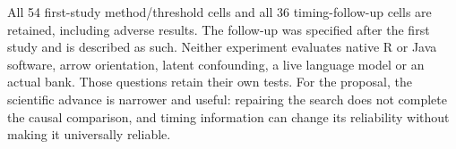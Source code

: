 All 54 first-study method/threshold cells and all 36 timing-follow-up cells
are retained, including adverse results. The follow-up was specified after
the first study and is described as such. Neither experiment evaluates native
R or Java software, arrow orientation, latent confounding, a live language
model or an actual bank. Those questions retain their own tests. For the
proposal, the scientific advance is narrower and useful: repairing the search
does not complete the causal comparison, and timing information can change
its reliability without making it universally reliable.
